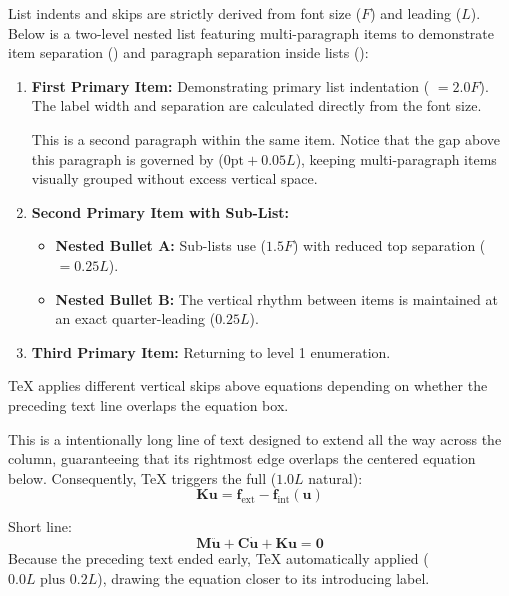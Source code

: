 \documentclass[paper=a4, fontsize=9]{habshe-tufte}
\begin{document}
List indents and skips are strictly derived from font size ($F$) and leading ($L$). Below is a two-level nested list featuring multi-paragraph items to demonstrate item separation (\texttt{\string\habshe@list@itemsep}) and paragraph separation inside lists (\texttt{\string\habshe@list@parsep}):

\begin{enumerate}
\item \textbf{First Primary Item:} Demonstrating primary list indentation (\texttt{\string\leftmargini} $= 2.0F$). The label width and separation are calculated directly from the font size.

  This is a second paragraph within the same item. Notice that the gap above this paragraph is governed by \texttt{\string\parsep} ($0\text{pt} + 0.05L$), keeping multi-paragraph items visually grouped without excess vertical space.

\item \textbf{Second Primary Item with Sub-List:}
  \begin{itemize}
  \item \textbf{Nested Bullet A:} Sub-lists use \texttt{\string\leftmarginii} ($1.5F$) with reduced top separation (\texttt{\string\habshe@list@topsep@ii} $= 0.25L$).
  \item \textbf{Nested Bullet B:} The vertical rhythm between items is maintained at an exact quarter-leading ($0.25L$).
  \end{itemize}

\item \textbf{Third Primary Item:} Returning to level 1 enumeration.
\end{enumerate}


TeX applies different vertical skips above equations depending on whether the preceding text line overlaps the equation box.

This is a intentionally long line of text designed to extend all the way across the column, guaranteeing that its rightmost edge overlaps the centered equation below. Consequently, TeX triggers the full \texttt{\string\abovedisplayskip} ($1.0L$ natural):
$$
\mathbf{K} \mathbf{u} = \mathbf{f}_{\text{ext}} - \mathbf{f}_{\text{int}}(\mathbf{u})
$$

Short line:
$$
\mathbf{M}\ddot{\mathbf{u}} + \mathbf{C}\dot{\mathbf{u}} + \mathbf{K}\mathbf{u} = \mathbf{0}
$$
Because the preceding text ended early, TeX automatically applied \texttt{\string\abovedisplayshortskip} ($0.0L \text{ plus } 0.2L$), drawing the equation closer to its introducing label.
\end{document}
